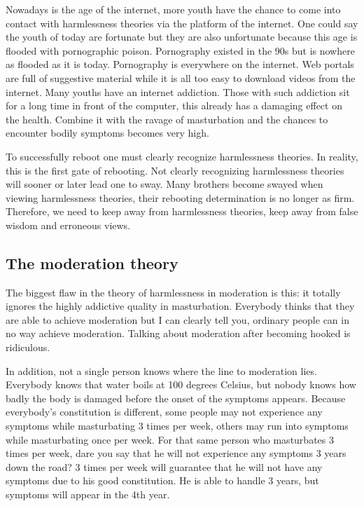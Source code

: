 \documentclass[
]{book}
\begin{document}
Nowadays is the age of the internet, more youth have the chance to come into contact with harmlessness theories via the platform of the internet. One could say the youth of today are fortunate but they are also unfortunate because this age is flooded with pornographic poison. Pornography existed in the 90s but is nowhere as flooded as it is today. Pornography is everywhere on the internet. Web portals are full of suggestive material while it is all too easy to download videos from the internet. Many youths have an internet addiction. Those with such addiction sit for a long time in front of the computer, this already has a damaging effect on the health. Combine it with the ravage of masturbation and the chances to encounter bodily symptoms becomes very high.

To successfully reboot one must clearly recognize harmlessness theories. In reality, this is the first gate of rebooting. Not clearly recognizing harmlessness theories will sooner or later lead one to sway. Many brothers become swayed when viewing harmlessness theories, their rebooting determination is no longer as firm. Therefore, we need to keep away from harmlessness theories, keep away from false wisdom and erroneous views.

\hypertarget{the-moderation-theory}{%
\subsection{The moderation theory}\label{the-moderation-theory}}

The biggest flaw in the theory of harmlessness in moderation is this: it totally ignores the highly addictive quality in masturbation. Everybody thinks that they are able to achieve moderation but I can clearly tell you, ordinary people can in no way achieve moderation. Talking about moderation after becoming hooked is ridiculous.

In addition, not a single person knows where the line to moderation lies. Everybody knows that water boils at 100 degrees Celsius, but nobody knows how badly the body is damaged before the onset of the symptoms appears. Because everybody's constitution is different, some people may not experience any symptoms while masturbating 3 times per week, others may run into symptoms while masturbating once per week. For that same person who masturbates 3 times per week, dare you say that he will not experience any symptoms 3 years down the road? 3 times per week will guarantee that he will not have any symptoms due to his good constitution. He is able to handle 3 years, but symptoms will appear in the 4th year.
\end{document}
